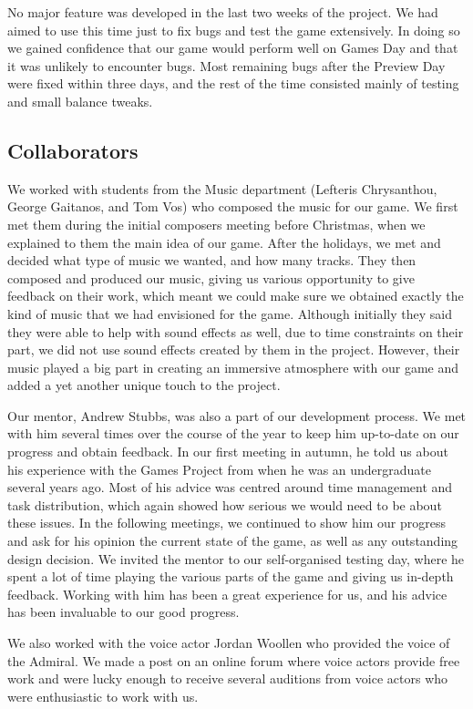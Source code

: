\documentclass[a4paper,11pt]{article}
\begin{document}
No major feature was developed in the last two weeks of the project. We had aimed to use this time just to fix bugs and test the game extensively. In doing so we gained confidence that our game would perform well on Games Day and that it was unlikely to encounter bugs. Most remaining bugs after the Preview Day were fixed within three days, and the rest of the time consisted mainly of testing and small balance tweaks.


\subsection{Collaborators}
We worked with students from the Music department (Lefteris Chrysanthou, George Gaitanos, and Tom Vos) who composed the music for our game. We first met them during the initial composers meeting before Christmas, when we explained to them the main idea of our game. After the holidays, we met and decided what type of music we wanted, and how many tracks. They then composed and produced our music, giving us various opportunity to give feedback on their work, which meant we could make sure we obtained exactly the kind of music that we had envisioned for the game. Although initially they said they were able to help with sound effects as well, due to time constraints on their part, we did not use sound effects created by them in the project. However, their music played a big part in creating an immersive atmosphere with our game and added a yet another unique touch to the project.

Our mentor, Andrew Stubbs, was also a part of our development process. We met with him several times over the course of the year to keep him up-to-date on our progress and obtain feedback. In our first meeting in autumn, he told us about his experience with the Games Project from when he was an undergraduate several years ago. Most of his advice was centred around time management and task distribution, which again showed how serious we would need to be about these issues. In the following meetings, we continued to show him our progress and ask for his opinion the current state of the game, as well as any outstanding design decision. We invited the mentor to our self-organised testing day, where he spent a lot of time playing the various parts of the game and giving us in-depth feedback. Working with him has been a great experience for us, and his advice has been invaluable to our good progress.

We also worked with the voice actor Jordan Woollen who provided the voice of the Admiral. We made a post on an online forum where voice actors provide free work and were lucky enough to receive several auditions from voice actors who were enthusiastic to work with us.
\end{document}
